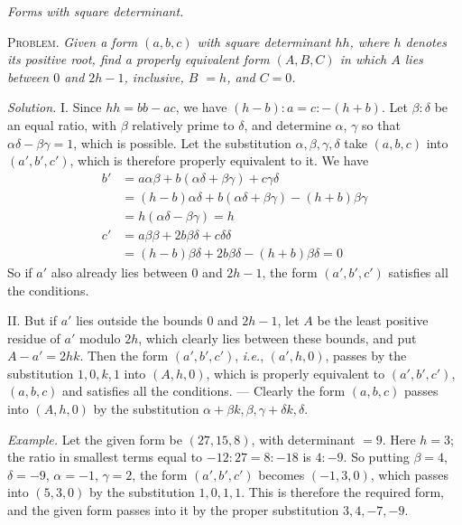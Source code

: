 \begin{center}
\textit{Forms with square determinant.}
\end{center}

\textsc{Problem.} \textit{Given a form $(a,b,c)$ with square determinant $hh$, where $h$ denotes its positive root, find a properly equivalent form $(A,B,C)$ in which $A$ lies between $0$ and $2h-1$, inclusive, $B$ $=h$, and $C=0$.}

\textit{Solution.} I. Since $hh=bb-ac$, we have $(h-b):a=c:-(h+b)$. Let $\beta:\delta$ be an equal ratio, with $\beta$ relatively prime to $\delta$, and determine $\alpha$, $\gamma$ so that $\alpha\delta-\beta\gamma=1$, which is possible. Let the substitution $\alpha,\beta,\gamma,\delta$ take $(a,b,c)$ into $(a',b',c')$, which is therefore properly equivalent to it. We have
\[
\begin{aligned}
b'&=a\alpha\beta+b(\alpha\delta+\beta\gamma)+c\gamma\delta\\
&=(h-b)\alpha\delta+b(\alpha\delta+\beta\gamma)-(h+b)\beta\gamma\\
&=h(\alpha\delta-\beta\gamma)=h\\
c'&=a\beta\beta+2b\beta\delta+c\delta\delta\\
&=(h-b)\beta\delta+2b\beta\delta-(h+b)\beta\delta=0
\end{aligned}
\]
So if $a'$ also already lies between $0$ and $2h-1$, the form $(a',b',c')$ satisfies all the conditions.

II. But if $a'$ lies outside the bounds $0$ and $2h-1$, let $A$ be the least positive residue of $a'$ modulo $2h$, which clearly lies between these bounds, and put $A-a'=2hk$. Then the form $(a',b',c')$, \textit{i.e.}, $(a',h,0)$, passes by the substitution $1,0,k,1$ into $(A,h,0)$, which is properly equivalent to $(a',b',c')$, $(a,b,c)$ and satisfies all the conditions. --- Clearly the form $(a,b,c)$ passes into $(A,h,0)$ by the substitution $\alpha+\beta k,\beta,\gamma+\delta k,\delta$.

\textit{Example.} Let the given form be $(27,15,8)$, with determinant $=9$. Here $h=3$; the ratio in smallest terms equal to $-12:27=8:-18$ is $4:-9$. So putting $\beta=4$, $\delta=-9$, $\alpha=-1$, $\gamma=2$, the form $(a',b',c')$ becomes $(-1,3,0)$, which passes into $(5,3,0)$ by the substitution $1,0,1,1$. This is therefore
the required form, and the given form passes into it by the proper substitution $3,4,-7,-9$.

